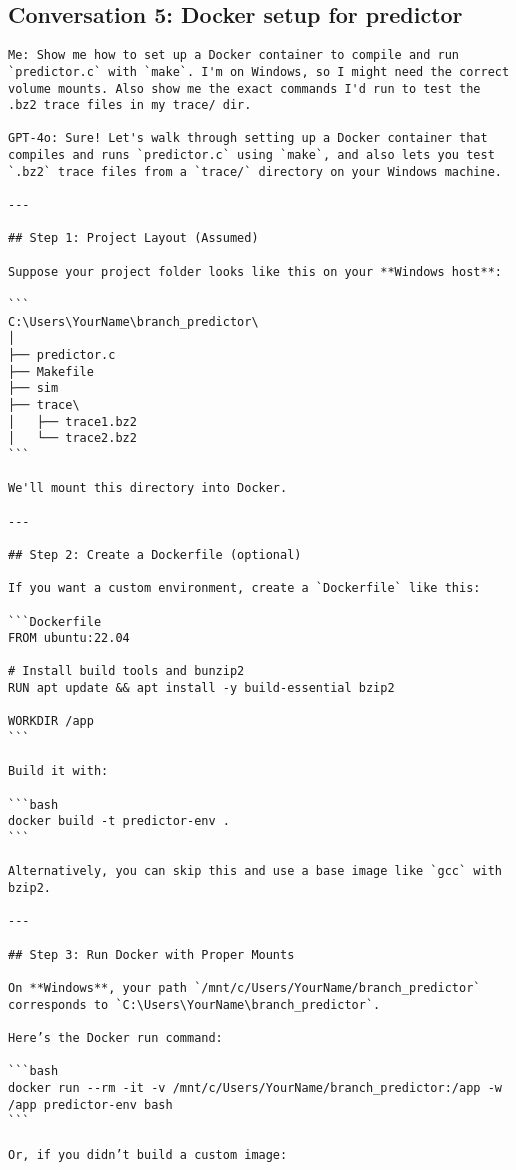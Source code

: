 \documentclass[sigconf, screen]{acmart}
\begin{document}
\subsection{Conversation 5: Docker setup for predictor}
\begin{Verbatim}[fontsize=\tiny, breaklines=true]
Me: Show me how to set up a Docker container to compile and run `predictor.c` with `make`. I'm on Windows, so I might need the correct volume mounts. Also show me the exact commands I'd run to test the .bz2 trace files in my trace/ dir.

GPT-4o: Sure! Let's walk through setting up a Docker container that compiles and runs `predictor.c` using `make`, and also lets you test `.bz2` trace files from a `trace/` directory on your Windows machine.

---

## Step 1: Project Layout (Assumed)

Suppose your project folder looks like this on your **Windows host**:

```
C:\Users\YourName\branch_predictor\
│
├── predictor.c
├── Makefile
├── sim
├── trace\
│   ├── trace1.bz2
│   └── trace2.bz2
```

We'll mount this directory into Docker.

---

## Step 2: Create a Dockerfile (optional)

If you want a custom environment, create a `Dockerfile` like this:

```Dockerfile
FROM ubuntu:22.04

# Install build tools and bunzip2
RUN apt update && apt install -y build-essential bzip2

WORKDIR /app
```

Build it with:

```bash
docker build -t predictor-env .
```

Alternatively, you can skip this and use a base image like `gcc` with bzip2.

---

## Step 3: Run Docker with Proper Mounts

On **Windows**, your path `/mnt/c/Users/YourName/branch_predictor` corresponds to `C:\Users\YourName\branch_predictor`.

Here’s the Docker run command:

```bash
docker run --rm -it -v /mnt/c/Users/YourName/branch_predictor:/app -w /app predictor-env bash
```

Or, if you didn’t build a custom image:


\end{Verbatim}
\end{document}
